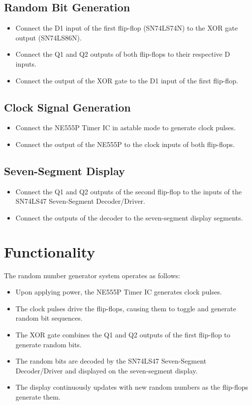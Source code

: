 \documentclass[journal,12pt,twocolumn]{IEEEtran}
\begin{document}
\subsection{Random Bit Generation}
\begin{itemize}
    \item Connect the D1 input of the first flip-flop (SN74LS74N) to the XOR gate output (SN74LS86N).
    \item Connect the Q1 and Q2 outputs of both flip-flops to their respective D inputs.
    \item Connect the output of the XOR gate to the D1 input of the first flip-flop.
\end{itemize}

\subsection{Clock Signal Generation}
\begin{itemize}
    \item Connect the NE555P Timer IC in astable mode to generate clock pulses.
    \item Connect the output of the NE555P to the clock inputs of both flip-flops.
\end{itemize}

\subsection{Seven-Segment Display}
\begin{itemize}
    \item Connect the Q1 and Q2 outputs of the second flip-flop to the inputs of the SN74LS47 Seven-Segment Decoder/Driver.
    \item Connect the outputs of the decoder to the seven-segment display segments.
\end{itemize}

\section{Functionality}
The random number generator system operates as follows:

\begin{itemize}
    \item Upon applying power, the NE555P Timer IC generates clock pulses.
    \item The clock pulses drive the flip-flops, causing them to toggle and generate random bit sequences.
    \item The XOR gate combines the Q1 and Q2 outputs of the first flip-flop to generate random bits.
    \item The random bits are decoded by the SN74LS47 Seven-Segment Decoder/Driver and displayed on the seven-segment display.
    \item The display continuously updates with new random numbers as the flip-flops generate them.
\end{itemize}
\end{document}
